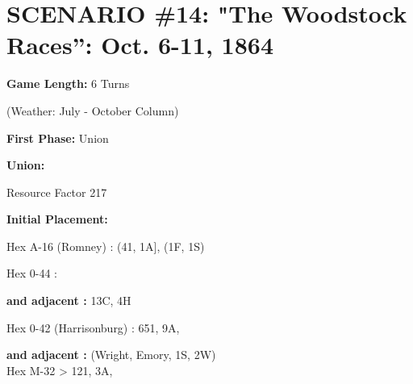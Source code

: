 \section{SCENARIO \#14: "The Woodstock Races'': Oct. 6-11, 1864
}


\begin{scenariodata}
\textbf{Game Length:} 6 Turns\\
\end{scenariodata}

\begin{scenariodata}
(Weather: July - October Column)\\
\end{scenariodata}

\begin{scenariodata}
\textbf{First Phase:} Union\\
\end{scenariodata}

\begin{scenariodata}
\textbf{Union:}\\
\end{scenariodata}

\begin{scenariodata}
Resource Factor 217\\
\end{scenariodata}

\begin{scenariodata}
\textbf{Initial Placement:}\\
\end{scenariodata}

\begin{scenariodata}
Hex A-16 (Romney) : (41, 1A], (1F, 1S)\\
\end{scenariodata}

\begin{scenariodata}
Hex 0-44 :\\
\end{scenariodata}

\begin{scenariodata}
\textbf{and adjacent :} 13C, 4H\\
\end{scenariodata}

\begin{scenariodata}
Hex 0-42 (Harrisonburg) : 651, 9A,\\
\end{scenariodata}

\begin{scenariodata}
\textbf{and adjacent :} (Wright, Emory, 1S, 2W)\\
Hex M-32 > 121, 3A,\\
\end{scenariodata}

